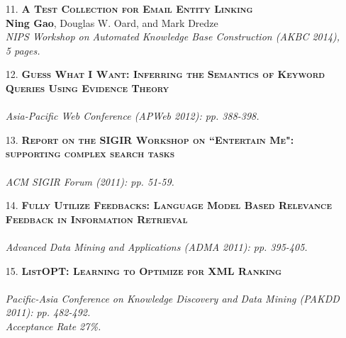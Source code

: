 \documentclass[a4paper, 11pt]{article}
\begin{document}
\begin{itemize}
\item[\color{bl3} 11.]{\scshape\color{bl3}\bf A Test Collection for Email Entity Linking}\\
{\color{black} \textbf{Ning Gao}, Douglas W. Oard, and Mark Dredze \\
\emph{NIPS Workshop on Automated Knowledge Base Construction (AKBC 2014), 5 pages.}}
\vspace{2mm}

        
\item[\color{bl3} 12.]{\scshape\color{bl3}\bf Guess What I Want: Inferring the Semantics of Keyword Queries Using Evidence Theory}\\
\\
\emph{ Asia-Pacific Web Conference (APWeb 2012): pp. 388-398.}
\vspace{2mm}



\item[\color{bl3} 13.]{\scshape\color{bl3}\bf Report on the SIGIR Workshop on ``Entertain Me": supporting complex search tasks}\\
\\
\emph{ ACM SIGIR Forum (2011): pp. 51-59.}
\vspace{2mm}

\item[\color{bl3} 14.]{\scshape\color{bl3}\bf Fully Utilize Feedbacks: Language Model Based Relevance Feedback in Information Retrieval}\\
\\
\emph{ Advanced Data Mining and Applications (ADMA 2011): pp. 395-405.}
\vspace{2mm}

\item[\color{bl3} 15.]{\scshape\color{bl3}\bf ListOPT: Learning to Optimize for XML Ranking}\\
\\
\emph{ Pacific-Asia Conference on Knowledge Discovery and Data Mining (PAKDD 2011): pp. 482-492.\\Acceptance Rate 27\%.}

\vspace{2mm}


\end{itemize}
\end{document}
